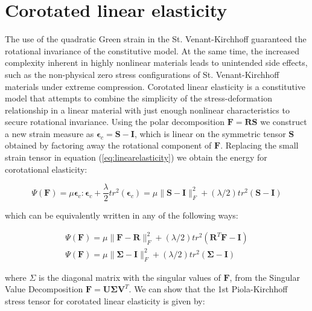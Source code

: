 \section{Corotated linear elasticity}
The use of the quadratic Green strain in the St. Venant-Kirchhoff guaranteed the rotational invariance of the constitutive model. At the same time, 
the increased complexity inherent in highly nonlinear materials leads to unintended side effects, such as the non-physical zero stress configurations 
of St. Venant-Kirchhoff materials under extreme compression. Corotated linear elasticity is a constitutive model that attempts to combine the simplicity 
of the stress-deformation relationship in a linear material with just enough nonlinear characteristics to secure rotational invariance.
Using the polar decomposition $\boldsymbol{F} = \boldsymbol{R}\boldsymbol{S}$ we construct a new strain measure as
$\boldsymbol{\epsilon}_c = \boldsymbol{S} − \boldsymbol{I}$, which is linear on the symmetric tensor $\boldsymbol{S}$ obtained by factoring away
the rotational component of $\boldsymbol{F}$. Replacing the small strain tensor in equation (\ref{eq:linearelasticity}) we obtain the energy for corotational 
elasticity:

\begin{equation}
\label{eq:CorotatedEnergyDensity}
  \Psi(\boldsymbol{F})=\mu\boldsymbol{\epsilon}_c:\boldsymbol{\epsilon}_c+\frac{\lambda}{2} tr^2(\boldsymbol{\epsilon}_c)=
  \mu\|\boldsymbol{S} - \boldsymbol{I} \|^2_F+(\lambda/2)tr^2(\boldsymbol{S}-\boldsymbol{I})
\end{equation}

which can be equivalently written in any of the following ways:

\begin{align}
\label{eq:CorotatedEnergyDensitySVD}
\Psi(\boldsymbol{F})=\mu\|\boldsymbol{F} - \boldsymbol{R}\|^2_F+(\lambda/2) tr^2(\boldsymbol{R}^T\boldsymbol{F}-\boldsymbol{I}) \nonumber \\
\Psi(\boldsymbol{F})=\mu\|\boldsymbol{\Sigma} - \boldsymbol{I} \|^2_F+(\lambda/2) tr^2(\boldsymbol{\Sigma} - \boldsymbol{I})
\end{align}

where $\Sigma$ is the diagonal matrix with the singular values of $\boldsymbol{F}$, from the Singular Value Decomposition 
$\boldsymbol{F} = \boldsymbol{U\Sigma V}^T$. We can show that the 1st Piola-Kirchhoff stress tensor for corotated linear elasticity is given by:
 
 

